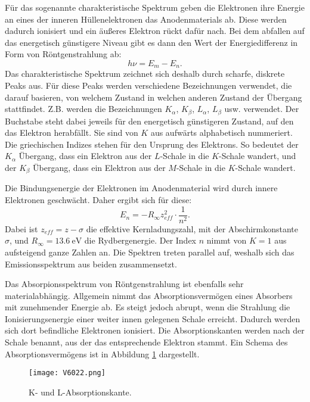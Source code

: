 \documentclass[
  bibliography=totoc,     %
  captions=tableheading,  %
  titlepage=firstiscover, %
]{scrartcl}
\begin{document}
\noindent
Für das sogenannte charakteristische Spektrum geben die Elektronen ihre Energie
an eines der inneren Hüllenelektronen das Anodenmaterials ab. Diese werden
dadurch ionisiert und ein äußeres Elektron rückt dafür nach. Bei dem abfallen
auf das energetisch günstigere Niveau gibt es dann den Wert der
Energiedifferenz in Form von Röntgenstrahlung ab:
\begin{equation}
  h \nu = E_m - E_n.
  \label{eqn:energdif}
\end{equation}
Das charakteristische Spektrum zeichnet sich deshalb durch scharfe, diskrete
Peaks aus. Für diese Peaks werden verschiedene Bezeichnungen verwendet, die
darauf basieren, von welchem Zustand in welchen anderen Zustand der Übergang
stattfindet. Z.B. werden die Bezeichnungen $K_\alpha$, $K_\beta$, $L_\alpha$,
$L_\beta$ usw. verwendet. Der Buchstabe steht dabei jeweils für den energetisch
günstigeren Zustand, auf den das Elektron herabfällt. Sie sind von $K$ aus
aufwärts alphabetisch nummeriert. Die griechischen Indizes stehen für den
Ursprung des Elektrons. So bedeutet der $K_\alpha$ Übergang, dass ein Elektron
aus der $L$-Schale in die $K$-Schale wandert, und der $K_\beta$ Übergang, dass
ein Elektron aus der $M$-Schale in die $K$-Schale wandert.

\noindent
Die Bindungsenergie der Elektronen im Anodenmaterial wird durch innere Elektronen
geschwächt. Daher ergibt sich für diese:
\begin{equation}
  E_n = - R_\infty z_{eff}^2 \cdot \frac{1}{n^2}.
  \label{eqn:bindungsen}
\end{equation}
Dabei ist $z_{eff} = z - \sigma$ die effektive Kernladungszahl, mit der
Abschirmkonstante $\sigma$, und $R_\infty = \SI{13.6}{\electronvolt}$ die
Rydbergenergie. Der Index $n$ nimmt von $K = 1$ aus aufsteigend ganze Zahlen an.
Die Spektren treten parallel auf, weshalb sich das Emissionsspektrum aus beiden
zusammensetzt.

\noindent
Das Absorpionsspektrum von Röntgenstrahlung ist ebenfalls sehr materialabhängig.
Allgemein nimmt das Absorptionsvermögen eines Absorbers mit zunehmender Energie
ab. Es steigt jedoch abrupt, wenn die Strahlung die Ionisierungsenergie einer
weiter innen gelegenen Schale erreicht. Dadurch werden sich dort befindliche
Elektronen ionisiert. Die Absorptionskanten werden nach der
Schale benannt, aus der das entsprechende Elektron stammt.
Ein Schema des Absorptionsvermögens ist in Abbildung \ref{fig:V6022}
dargestellt.
\begin{figure}[htb]
  \centering
  \texttt{[image: V6022.png]}
  \caption{K- und L-Absorptionskante. \cite{anleitung}}
  \label{fig:V6022}
\end{figure}
\end{document}
